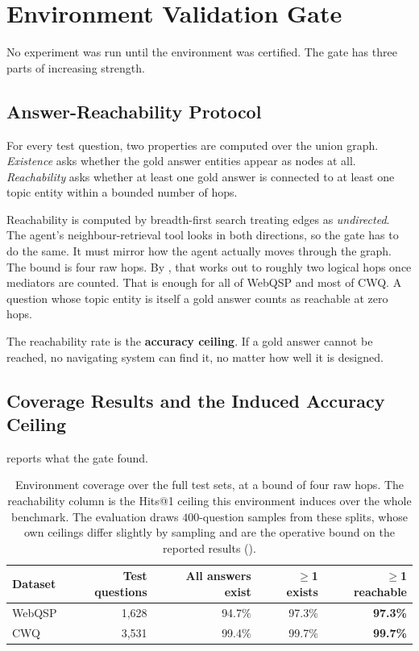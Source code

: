 \section{Environment Validation Gate}\label{sec:validation-gate}

No experiment was run until the environment was certified. The gate has three
parts of increasing strength.

\subsection{Answer-Reachability Protocol}

For every test question, two properties are computed over the union graph.
\emph{Existence} asks whether the gold answer entities appear as nodes at all.
\emph{Reachability} asks whether at least one gold answer is connected to at
least one topic entity within a bounded number of hops.

Reachability is computed by breadth-first search treating edges as
\emph{undirected}. The agent's neighbour-retrieval tool looks in both
directions, so the gate has to do the same. It must mirror how the agent
actually moves through the graph. The bound is four raw hops. By
, that works out to roughly two logical hops once
mediators are counted. That is enough for all of WebQSP and most of CWQ. A
question whose topic entity is itself a gold answer counts as reachable at zero
hops.

The reachability rate is the \textbf{accuracy ceiling}. If a gold answer cannot
be reached, no navigating system can find it, no matter how well it is designed.

\subsection{Coverage Results and the Induced Accuracy Ceiling}

 reports what the gate found.

\begin{table}[!tb]
  \begin{center}
    \caption[Environment coverage over the full test sets]{Environment coverage
    over the full test sets, at a bound of four raw hops. The reachability
    column is the Hits@1 ceiling this environment induces over the whole
    benchmark. The evaluation draws $400$-question samples from these splits,
    whose own ceilings differ slightly by sampling and are the operative bound
    on the reported results ().}
    \label{tab:coverage}
    \begin{tabular}{|l|r|r|r|r|}
      \hline
      \textbf{Dataset} & \textbf{Test questions} & \textbf{All answers exist} &
      \textbf{$\geq$1 exists} & \textbf{$\geq$1 reachable} \\
      \hline
      WebQSP & 1{,}628 & 94.7\% & 97.3\% & \textbf{97.3\%} \\
      CWQ    & 3{,}531 & 99.4\% & 99.7\% & \textbf{99.7\%} \\
      \hline
    \end{tabular}
  \end{center}
\end{table}

